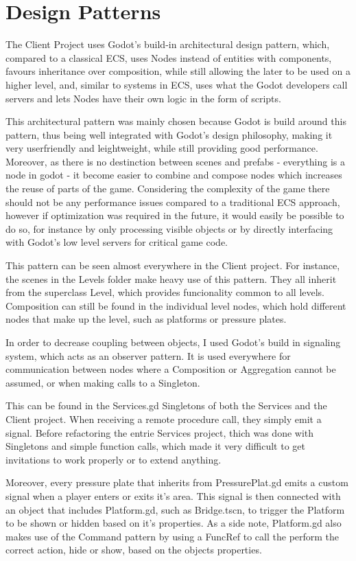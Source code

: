 \documentclass{article}
\begin{document}
\section{Design Patterns}
The Client Project uses Godot's build-in architectural design pattern, which, compared to a classical ECS, uses Nodes instead of entities with components, favours inheritance over composition, while still allowing the later to be used on a higher level, and, similar to systems in ECS, uses what the Godot developers call servers and lets Nodes have their own logic in the form of scripts. 

This architectural pattern was mainly chosen because Godot is build around this pattern, thus being well integrated with Godot's design philosophy, making it very userfriendly and leightweight, while still providing good performance. Moreover, as there is no destinction between scenes and prefabs - everything is a node in godot - it become easier to combine and compose nodes which increases the reuse of parts of the game. Considering the complexity of the game there should not be any performance issues compared to a traditional ECS approach, however if optimization was required in the future, it would easily be possible to do so, for instance  by only processing visible objects or by directly interfacing with Godot's low level servers for critical game code. 

This pattern can be seen almost everywhere in the Client project. For instance, the scenes in the Levels folder make heavy use of this pattern. They all inherit from the superclass Level, which provides funcionality common to all levels. Composition can still be found in the individual level nodes, which hold different nodes that make up the level, such as platforms or pressure plates.

\bigskip
In order to decrease coupling between objects, I used Godot's build in signaling system, which acts as an observer pattern. It is used everywhere for communication between nodes where a Composition or Aggregation cannot be assumed, or when making calls to a Singleton. 

This can be found in the Services.gd Singletons of both the Services and the Client project. When receiving a remote procedure call, they simply emit a signal. Before refactoring the entrie Services project, thich was done with Singletons and simple function calls, which made it very difficult to get invitations to work properly or to extend anything. 

Moreover, every pressure plate that inherits from PressurePlat.gd emits a custom signal when a player enters or exits it's area. This signal is then connected with an object that includes Platform.gd, such as Bridge.tscn, to trigger the Platform to be shown or hidden based on it's properties. As a side note, Platform.gd also makes use of the Command pattern by using a FuncRef to call the perform the correct action, hide or show, based on the objects properties.
\end{document}
